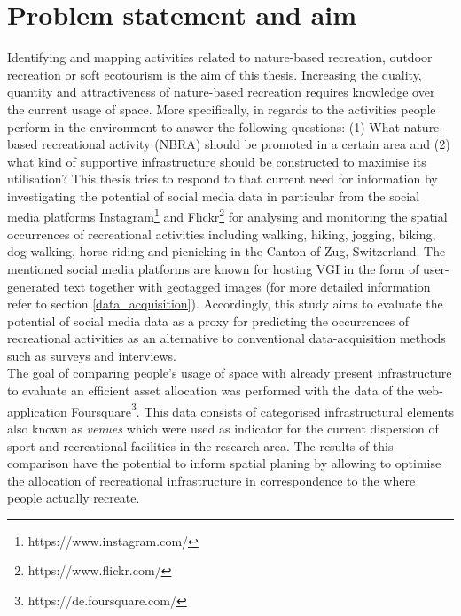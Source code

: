 \section{Problem statement and aim}
Identifying and mapping activities related to nature-based recreation, outdoor recreation or soft ecotourism is the aim of this thesis.
Increasing the quality, quantity and attractiveness of nature-based recreation requires knowledge over the current usage of space. More specifically, in regards to the activities people perform in the environment to answer the following questions: (1) What nature-based recreational activity (NBRA) should be promoted in a certain area and (2) what kind of supportive infrastructure should be constructed to maximise its utilisation? This thesis tries to respond to that current need for information by investigating the potential of social media data in particular from the social media platforms Instagram\footnote{https://www.instagram.com/} and Flickr\footnote{https://www.flickr.com/} for analysing and monitoring the spatial occurrences of recreational activities including walking, hiking, jogging, biking, dog walking, horse riding and picnicking in the Canton of Zug, Switzerland. The mentioned social media platforms are known for hosting VGI in the form of user-generated text together with geotagged images (for more detailed information refer to section \ref{data_acquisition}). Accordingly, this study aims to evaluate the potential of social media data as a proxy for predicting the occurrences of recreational activities as an alternative to conventional data-acquisition methods such as surveys and interviews.\\

The goal of comparing people's usage of space with already present infrastructure to evaluate an efficient asset allocation was performed with the data of the web-application Foursquare\footnote{https://de.foursquare.com/}. This data consists of categorised infrastructural elements also known as \textit{venues} which were used as indicator for the current dispersion of sport and recreational facilities in the research area. The results of this comparison have the potential to inform spatial planing by allowing to optimise the allocation of recreational infrastructure in correspondence to the where people actually recreate.

